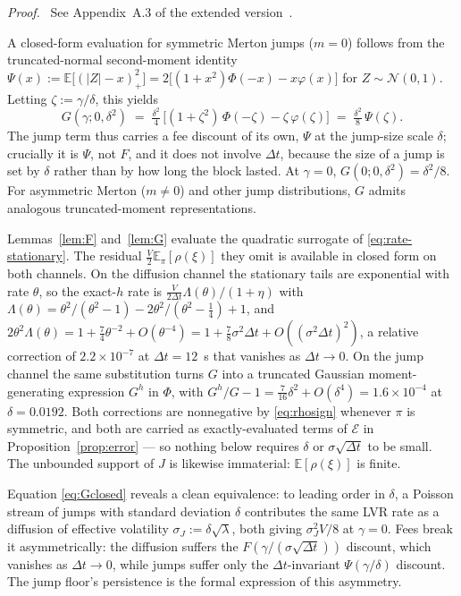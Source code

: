 \documentclass[runningheads]{llncs}
\newcommand{\E}{\mathbb{E}}
\newcommand{\dt}{\Delta t}
\newcommand{\1}{\mathbf{1}}
\newif\ifextended
\newcommand{\deferproof}[1]{%
  \par\smallskip\noindent\textit{Proof.}\ \ifextended
  See Appendix~#1.\else
  See Appendix~#1 of the extended version~\cite{bundi2026ext}.\fi\par\smallskip}
\begin{document}
\deferproof{A.3}

A closed-form evaluation for symmetric Merton jumps ($m=0$) follows from the truncated-normal second-moment identity
$\Psi(x) := \E\big[(|Z|-x)_+^2\big] = 2\big[(1+x^2)\Phi(-x) - x\varphi(x)\big]$ for $Z\sim\mathcal N(0,1)$.
Letting $\zeta := \gamma/\delta$, this yields
\begin{equation}\label{eq:Gclosed}
G(\gamma; 0, \delta^2) \;=\; \tfrac{\delta^2}{4}\,\big[(1+\zeta^2)\,\Phi(-\zeta) - \zeta\,\varphi(\zeta)\big] \;=\; \tfrac{\delta^2}{8}\,\Psi(\zeta).
\end{equation}
The jump term thus carries a fee discount of its own, $\Psi$ at the jump-size scale $\delta$; crucially it is $\Psi$, not $F$, and it does not involve $\dt$, because the size of a jump is set by $\delta$ rather than by how long the block lasted. At $\gamma=0$, $G(0;0,\delta^2) = \delta^2/8$. For asymmetric Merton ($m \neq 0$) and other jump distributions, $G$ admits analogous truncated-moment representations.

\begin{remark}\label{rem:curvature}
Lemmas~\ref{lem:F} and~\ref{lem:G} evaluate the quadratic surrogate of \eqref{eq:rate-stationary}. The residual $\tfrac{V}{2}\E_\pi[\rho(\xi)]$ they omit is available in closed form on both channels. On the diffusion channel the stationary tails are exponential with rate $\theta$, so the exact-$h$ rate is $\tfrac{V}{2\dt}\Lambda(\theta)/(1+\eta)$ with $\Lambda(\theta) = \theta^2/(\theta^2-1) - 2\theta^2/(\theta^2-\tfrac14) + 1$, and
$2\theta^2\Lambda(\theta) = 1 + \tfrac{7}{4}\theta^{-2} + O(\theta^{-4}) = 1 + \tfrac{7}{8}\sigma^2\dt + O((\sigma^2\dt)^2)$,
a relative correction of $2.2\times10^{-7}$ at $\dt=12$~s that vanishes as $\dt\to0$. On the jump channel the same substitution turns $G$ into a truncated Gaussian moment-generating expression $G^{h}$ in $\Phi$, with $G^{h}/G - 1 = \tfrac{7}{16}\delta^2 + O(\delta^4) = 1.6\times10^{-4}$ at $\delta=0.0192$. Both corrections are nonnegative by \eqref{eq:rhosign} whenever $\pi$ is symmetric, and both are carried as exactly-evaluated terms of $\mathcal{E}$ in Proposition~\ref{prop:error} --- so nothing below requires $\delta$ or $\sigma\sqrt{\dt}$ to be small. The unbounded support of $J$ is likewise immaterial: $\E[\rho(\xi)]$ is finite.
\end{remark}

\begin{remark}\label{rem:lvrequivalence}
Equation \eqref{eq:Gclosed} reveals a clean equivalence: to leading order in $\delta$, a Poisson stream of jumps with standard deviation $\delta$ contributes the same LVR rate as a diffusion of effective volatility $\sigma_J := \delta\sqrt{\lambda}$, both giving $\sigma_J^2 V/8$ at $\gamma=0$. Fees break it asymmetrically: the diffusion suffers the $F(\gamma/(\sigma\sqrt{\dt}))$ discount, which vanishes as $\dt \to 0$, while jumps suffer only the $\dt$-invariant $\Psi(\gamma/\delta)$ discount. The jump floor's persistence is the formal expression of this asymmetry.
\end{remark}
\end{document}
